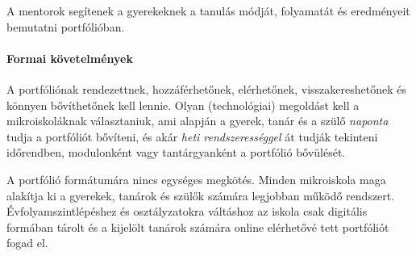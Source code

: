 A mentorok segítenek a gyerekeknek a tanulás módját, folyamatát és eredményeit bemutatni portfólióban.

\paragraph{Formai követelmények}
A portfóliónak rendezettnek, hozzáférhetőnek, elérhetőnek, visszakereshetőnek és könnyen bővíthetőnek kell lennie. Olyan (technológiai) megoldást kell a mikroiskoláknak választaniuk, ami alapján a gyerek, tanár és a szülő \emph{naponta} tudja a portfóliót bővíteni, és akár \emph{heti rendszerességgel} át tudják tekinteni időrendben, modulonként vagy tantárgyanként a portfólió bővülését.

A portfólió formátumára nincs egységes megkötés. Minden mikroiskola maga alakítja ki a gyerekek, tanárok és szülők számára legjobban működő rendszert. Évfolyamszintlépéshez és osztályzatokra váltáshoz az iskola csak digitális formában tárolt és a kijelölt tanárok számára online elérhetővé tett portfóliót fogad el.
